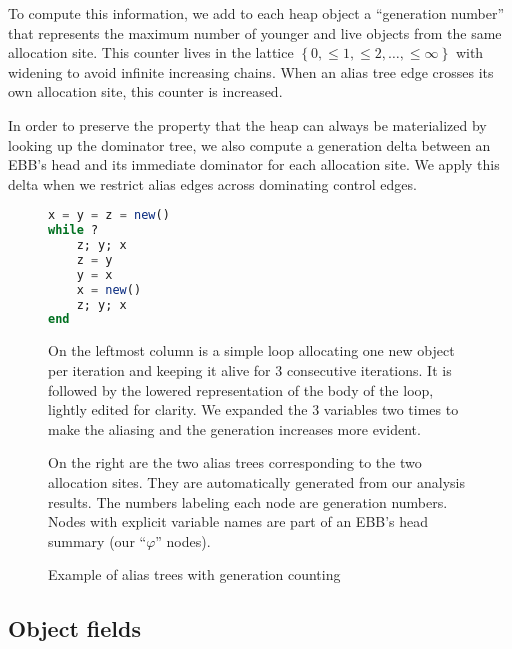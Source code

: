 \documentclass[11pt]{article}
\renewcommand{\phi}{\varphi}
\begin{document}
To compute this information, we add to each heap object a ``generation number'' that represents the maximum number of younger and live objects from the same allocation site. This counter lives in the lattice $\left\{0, \leq 1, \leq 2, \dots, \leq \infty \right\}$ with widening to avoid infinite increasing chains.
When an alias tree edge crosses its own allocation site, this counter is increased.

In order to preserve the property that the heap can always be materialized by looking up the dominator tree, we also compute a generation delta between an EBB's head and its immediate dominator for each allocation site.
We apply this delta when we restrict alias edges across dominating control edges.

\begin{figure}

\begin{minipage}{0.2\linewidth}
\begin{lstlisting}[language=julia]
x = y = z = new()
while ?
    z; y; x
    z = y
    y = x
    x = new()
    z; y; x
end
\end{lstlisting}
\end{minipage}
\qquad
\begin{minipage}{0.4\linewidth}
\scalebox{.7}{}
\end{minipage}
\caption{Example of alias trees with generation counting}
On the leftmost column is a simple loop allocating one new object per iteration and keeping it alive for 3 consecutive iterations. It is followed by the lowered representation of the body of the loop, lightly edited for clarity. We expanded the 3 variables two times to make the aliasing and the generation increases more evident.

On the right are the two alias trees corresponding to the two allocation sites. They are automatically generated from our analysis results. The numbers labeling each node are generation numbers. Nodes with explicit variable names are part of an EBB's head summary (our ``$\phi$'' nodes).
\end{figure}

\subsection*{Object fields}
\end{document}
